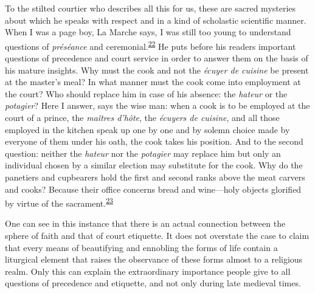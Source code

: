 To the stilted courtier who describes all this for us, these are sacred
mysteries about which he speaks with respect and in a kind of scholastic
scientific manner. When I was a page boy, La Marche says, I was still
too young to understand questions of \emph{préséance} and
ceremonial.\textsuperscript{\protect\hypertarget{09_Chapter_Two__THE_CRAVING_FOR_A_M.xhtmlux5cux23id_2043}{\protect\hyperlink{23_NOTES.xhtmlux5cux23id_2044}{22}}}
He puts before his readers important questions of precedence and court
service in order to answer them on the basis of his mature insights. Why
must the cook and not the \emph{écuyer de cuisine} be present at the
master's meal? In what manner must the cook come into employment at the
court? Who should replace him in case of his absence: the \emph{hateur}
or the \emph{potagier}? Here I answer, says the wise man: when a cook is
to be employed at the court of a prince, the \emph{maîtres d'hôte}, the
\emph{écuyers de cuisine}, and all those employed in the kitchen speak
up one by one and by solemn choice made by everyone of them under his
oath, the cook takes his position. And to the second question: neither
the \emph{hateur} nor the \emph{potagier} may replace him but only an
individual chosen by a similar election may substitute for the cook. Why
do the panetiers and cupbearers hold the first and second ranks above
the meat carvers and cooks? Because their office concerns bread and
wine---holy objects glorified by virtue of the
sacrament.\textsuperscript{\protect\hypertarget{09_Chapter_Two__THE_CRAVING_FOR_A_M.xhtmlux5cux23id_2041}{\protect\hyperlink{23_NOTES.xhtmlux5cux23id_2042}{23}}}

One can see in this instance that there is an actual connection between
the sphere of faith and that of court etiquette. It does not overstate
the case to claim that every means of beautifying and ennobling the
forms of life contain a liturgical element that raises the observance of
these forms almost to a religious realm. Only
\protect\hypertarget{09_Chapter_Two__THE_CRAVING_FOR_A_M.xhtmlux5cux23page_45}{}{}this
can explain the extraordinary importance people give to all questions of
precedence and etiquette, and not only during late medieval times.

